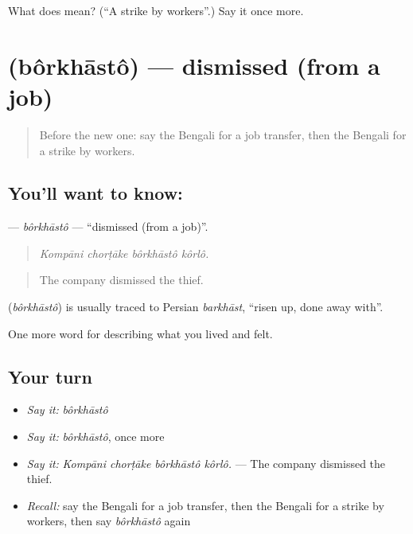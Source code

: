 \begin{tcolorbox}[breakable,colback=teal!4,colframe=teal!35!black,title={Before you move on}]
What does  mean? (\textquotedblleft{}A strike by workers\textquotedblright{}.) Say it once more.
\end{tcolorbox}
\section[\texorpdfstring{\bn{বরখাস্ত} (bôrkhāstô)}{বরখাস্ত (bôrkhāstô)}]{ (bôrkhāstô) — dismissed (from a job)}

\label{lesson:BN-C497-borkhasto}



\begin{quote}
Before the new one: say the Bengali for a job transfer, then the Bengali for a strike by workers.
\end{quote}

\subsection*{You'll want to know: }
\textbf{} — \emph{bôrkhāstô} — \textquotedblleft{}dismissed (from a job)\textquotedblright{}.

\begin{quote}
   
\end{quote}

\begin{quote}
\emph{Kompāni chorṭāke bôrkhāstô kôrlô.}
\end{quote}

\begin{quote}
The company dismissed the thief.
\end{quote}

\begin{cousinweb}
\textbf{} (\emph{bôrkhāstô}) is usually traced to Persian \emph{barkhāst}, \textquotedblleft{}risen up, done away with\textquotedblright{}.
\end{cousinweb}

\begin{grammarlens}[title={What you've built}]
One more word for describing what you lived and felt.
\end{grammarlens}

\subsection*{Your turn}
\begin{itemize}
\raggedright
  \item \emph{Say it:} \emph{bôrkhāstô}
  \item \emph{Say it:} \emph{bôrkhāstô}, once more
  \item \emph{Say it:} \emph{Kompāni chorṭāke bôrkhāstô kôrlô.} — The company dismissed the thief.
  \item \emph{Recall:} say the Bengali for a job transfer, then the Bengali for a strike by workers, then say \emph{bôrkhāstô} again
\end{itemize}

